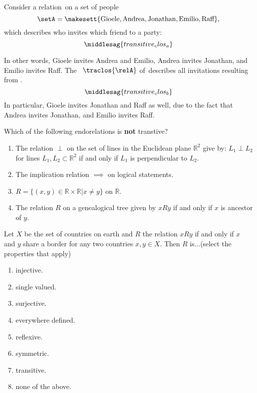 \begin{example}
    \label{exa:party}
    Consider a relation~\relA on a set of people
    \begin{equation}
        \setA=\makesett{\text{Gioele}, \text{Andrea}, \text{Jonathan}, \text{Emilio}, \text{Raff}},
    \end{equation}
    which describes who invites which friend to a party:
    \begin{equation}
        \label{eq:transitive_clos_a}
        \middlesag{transitive_clos_a}
    \end{equation}

    In other words, Gioele invites Andrea and Emilio, Andrea invites Jonathan, and Emilio invites Raff.
    The ~$\traclos{\relA}$ of~\relA describes all invitations resulting from .
    \begin{equation}
        \label{eq:transitive_clos_b}
        \middlesag{transitive_clos_b}
    \end{equation}
    In particular, Gioele invites Jonathan and Raff as well, due to the fact that Andrea invites Jonathan, and Emilio invites Raff.
\end{example}
\begin{quiz}
Which of the following endorelations is \textbf{not} transtive?
\begin{enumerate}[label=(\alph*)]
\item The relation $\perp$ on the set of lines in the Euclidean plane $\mathbb{R}^{2}$ give by: $L_{1}\perp L_{2}$ for lines $L_{1},L_{2}\subset\mathbb{R}^{2}$ if and only if $L_{1}$ is perpendicular to $L_{2}$.
\item The implication relation $\implies$ on logical statements.
\item $R=\{(x,y)\in\mathbb{R}\times\mathbb{R}\vert x\neq y\}$ on $\mathbb{R}$.
\item The relation $R$ on a genealogical tree given by $xRy$ if and only if $x$ is ancestor of $y$.
\end{enumerate}
\end{quiz}

\begin{quiz}
Let $X$ be the set of countries on earth and $R$ the relation $xRy$ if and only if $x$ and $y$ share a border for any two countries $x,y\in X$. Then $R$ is...(select the properties that apply)
\begin{enumerate}[label=(\alph*)]
\item injective.
\item single valued.
\item surjective.
\item everywhere defined.
\item reflexive.
\item symmetric.
\item transitive.
\item none of the above.
\end{enumerate}
\end{quiz}

